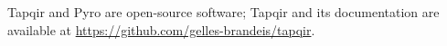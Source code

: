 Tapqir and Pyro are open-source software; Tapqir and its documentation are available at \url{https://github.com/gelles-brandeis/tapqir}.


